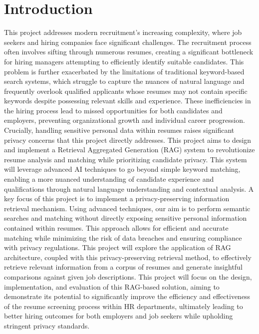 \documentclass[12pt]{report}
\begin{document}
\section{Introduction}

This project addresses modern recruitment's increasing complexity, where job seekers and hiring companies face significant challenges. The recruitment process often involves sifting through numerous resumes, creating a significant bottleneck for hiring managers attempting to efficiently identify suitable candidates. This problem is further exacerbated by the limitations of traditional keyword-based search systems, which struggle to capture the nuances of natural language and frequently overlook qualified applicants whose resumes may not contain specific keywords despite possessing relevant skills and experience. These inefficiencies in the hiring process lead to missed opportunities for both candidates and employers, preventing organizational growth and individual career progression. Crucially, handling sensitive personal data within resumes raises significant privacy concerns that this project directly addresses. This project aims to design and implement a Retrieval Aggregated Generation (RAG) system to revolutionize resume analysis and matching while prioritizing candidate privacy. This system will leverage advanced AI techniques to go beyond simple keyword matching, enabling a more nuanced understanding of candidate experience and qualifications through natural language understanding and contextual analysis. A key focus of this project is to implement a privacy-preserving information retrieval mechanism. Using advanced techniques, our aim is to perform semantic searches and matching without directly exposing sensitive personal information contained within resumes. This approach allows for efficient and accurate matching while minimizing the risk of data breaches and ensuring compliance with privacy regulations. 
This project will explore the application of RAG architecture, coupled with this privacy-preserving retrieval method, to effectively retrieve relevant information from a corpus of resumes and generate insightful comparisons against given job descriptions. This project will focus on the design, implementation, and evaluation of this RAG-based solution, aiming to demonstrate its potential to significantly improve the efficiency and effectiveness of the resume screening process within HR departments, ultimately leading to better hiring outcomes for both employers and job seekers while upholding stringent privacy standards. 
\end{document}
